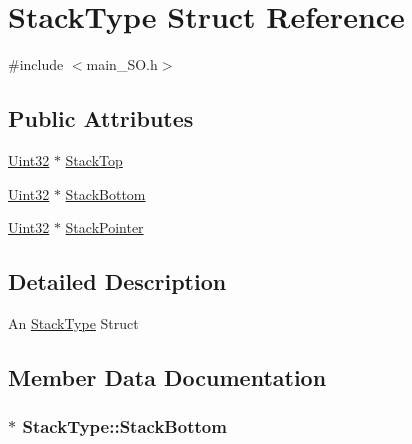 \hypertarget{struct_stack_type}{}\section{Stack\+Type Struct Reference}
\label{struct_stack_type}


{\ttfamily \#include $<$main\+\_\+\+S\+O.\+h$>$}

\subsection*{Public Attributes}
\begin{DoxyCompactItemize}
\item 
\hyperlink{_d_s_p2833x___device_8h_aba99025e657f892beb7ff31cecf64653}{Uint32} $\ast$ \hyperlink{struct_stack_type_a88c18557bed6c07dceb550560d9ea98f}{Stack\+Top}
\item 
\hyperlink{_d_s_p2833x___device_8h_aba99025e657f892beb7ff31cecf64653}{Uint32} $\ast$ \hyperlink{struct_stack_type_a86fc4a611a701430b46b73b9eb66e744}{Stack\+Bottom}
\item 
\hyperlink{_d_s_p2833x___device_8h_aba99025e657f892beb7ff31cecf64653}{Uint32} $\ast$ \hyperlink{struct_stack_type_a10eceda97205d97a0a28b07755e47dba}{Stack\+Pointer}
\end{DoxyCompactItemize}


\subsection{Detailed Description}
An \hyperlink{struct_stack_type}{Stack\+Type} Struct 

\subsection{Member Data Documentation}
\hypertarget{struct_stack_type_a86fc4a611a701430b46b73b9eb66e744}{}
\subsubsection[{Stack\+Bottom}]{$\ast$ Stack\+Type\+::\+Stack\+Bottom}\label{struct_stack_type_a86fc4a611a701430b46b73b9eb66e744}
\hypertarget{struct_stack_type_a10eceda97205d97a0a28b07755e47dba}{}
